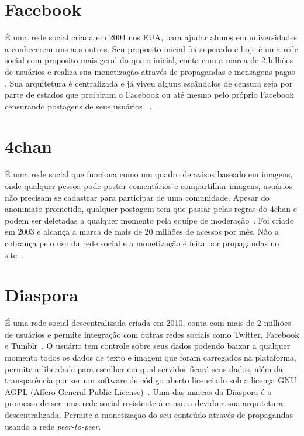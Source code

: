 \section{Facebook}

É uma rede social criada em 2004 nos EUA, para ajudar alunos em universidades a conhecerem uns aos outros.
Seu proposito inicial foi superado e hoje é uma rede social com proposito mais geral do que o inicial,
conta com a marca de 2 bilhões de usuários e realiza sua monetização através de propagandas e mensagens pagas~\cite{Facebook1} \cite{Facebook2}. Sua arquitetura é centralizada e já viveu alguns escândalos de censura seja por parte de estados que proibiram o Facebook ou até mesmo pelo próprio Facebook censurando postagens de seus usuários~\cite{Facebook4} \cite{Facebook5}.

\section{4chan}

É uma rede social que funciona como um quadro de avisos baseado em imagens, onde qualquer pessoa pode postar comentários e compartilhar imagens, usuários não precisam se cadastrar para participar de uma comunidade.
Apesar do anonimato prometido, qualquer postagem tem que passar pelas regras do 4chan e podem ser deletadas a qualquer momento pela equipe de moderação~\cite{4chan1}.
Foi criado em 2003 e alcança a marca de mais de 20 milhões de acessos por mês. Não a cobrança pelo uso da rede social e a monetização é feita por propagandas no site~\cite{4chan2}.

\section{Diaspora}

É uma rede social descentralizada criada em 2010, conta com mais de 2 milhões de usuários e permite integração com outras redes sociais como Twitter, Facebook e Tumblr~\cite{Diaspora1}.
O usuário tem controle sobre seus dados podendo baixar a qualquer momento todos os dados de texto e imagem que foram carregados na plataforma,
permite a liberdade para escolher em qual servidor ficará seus dados, 
além da transparência por ser um software de código aberto licenciado sob a licença GNU AGPL (Affero General Public License)~\cite{Diaspora2}. 
Uma das marcas da Diaspora é a promessa de ser uma rede social resistente à censura devido a sua arquitetura descentralizada.
Permite a monetização do seu conteúdo através de propagandas usando a rede \textit{peer-to-peer}.

